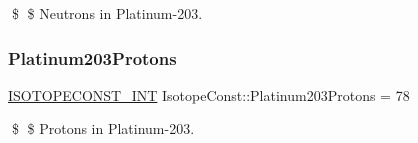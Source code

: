 \$ \$ Neutrons in Platinum-\/203. \mbox{\label{group___isotope_const-_platinum-_pt203_gac74c5d5ea40232ebc4c77232a107ce1f}} 
\subsubsection{\texorpdfstring{Platinum203\+Protons}{Platinum203Protons}}
{\footnotesize\ttfamily \mbox{\hyperlink{group___isotope_const-_macros_ga5f18360b3e99483a35c32d789e62621c}{I\+S\+O\+T\+O\+P\+E\+C\+O\+N\+S\+T\+\_\+\+I\+NT}} Isotope\+Const\+::\+Platinum203\+Protons = 78}

\$ \$ Protons in Platinum-\/203. 